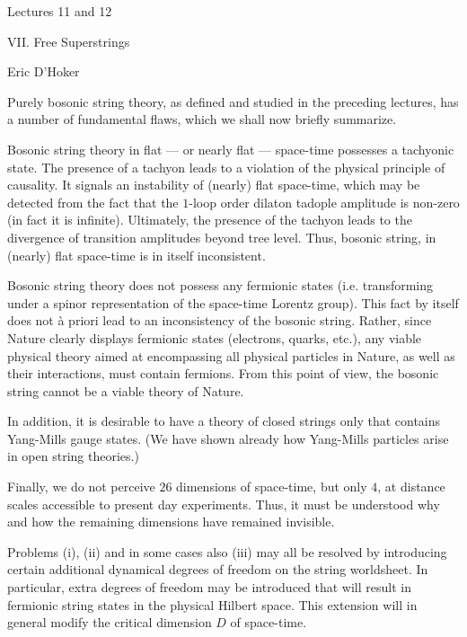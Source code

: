 
\parindent=25pt

\bigskip\bigskip
\centerline{\boldtitlefont Lectures 11 and 12}
\bigskip
\centerline{\smallboldtitle VII. Free Superstrings}

\medskip
\centerline{Eric D'Hoker}

\frenchspacing

\dspace
\bigskip
Purely bosonic string theory, as defined and studied in
the preceding lectures, has a number of fundamental
flaws, which we shall now briefly summarize.

\medskip
{}\enspace
Bosonic string theory in flat --- or nearly flat ---
space-time possesses a tachyonic state.
The presence of a tachyon leads to a violation of the
physical principle of causality.
It signals an instability of (nearly) flat 
space-time, which may be detected from the
fact that the $1$-loop order dilaton tadople amplitude
is non-zero (in fact it is infinite).
Ultimately, the presence of the tachyon leads to the
divergence of transition amplitudes beyond tree level.
Thus, bosonic string, in (nearly) flat 
space-time is in itself inconsistent.

\medskip
{}\enspace
Bosonic string theory does not possess any fermionic
states (i.e. transforming under a spinor
representation of the space-time Lorentz group).
This fact by itself does not \`a priori lead to
an inconsistency
of the bosonic string.
Rather, since Nature clearly displays fermionic states
(electrons, quarks, etc.), any viable physical
theory aimed at encompassing all physical particles in
Nature, as well as their interactions, must contain
fermions.
{}From this point of view, the bosonic string cannot be
a viable theory of Nature.

\medskip
{}\enspace
In addition, it is desirable 
to have a theory of closed strings only that
contains Yang-Mills gauge states.
(We have shown already how Yang-Mills particles arise
in open string theories.)

\medskip
{}\enspace
Finally, we do not perceive $26$ dimensions of
space-time, but only $4$, at distance scales
accessible to present day experiments.
Thus, it must be understood why and how the remaining
dimensions have remained invisible.

\medskip
Problems (i), (ii) and in some cases also (iii) may
all be resolved by introducing certain additional
dynamical degrees of freedom on the string worldsheet.
In particular, extra degrees of freedom may be
introduced that will result in
fermionic string states in the physical Hilbert space.
This extension will in general modify the critical
dimension $D$ of space-time.

